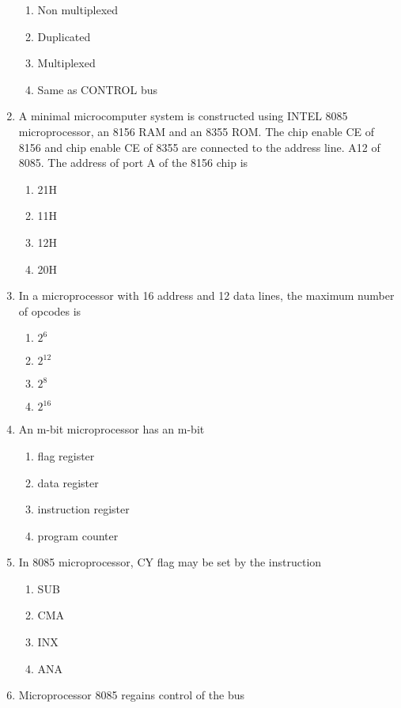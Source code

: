 \documentclass[journal,12pt,twocolumn]{IEEEtran}
\begin{document}
\begin{enumerate}
       \begin{enumerate}
      \item Non multiplexed
      \item Duplicated
      \item  Multiplexed 
      \item Same as CONTROL bus
    \end{enumerate}
    \item A minimal microcomputer system is constructed using INTEL 8085 microprocessor, an
8156 RAM and an 8355 ROM. The chip enable CE of 8156 and chip enable CE of 8355 are
connected to the address line. A12 of 8085. The address of port A of the 8156 chip is
     \begin{enumerate}
      \item 21H 
      \item 11H
      \item 12H
      \item 20H
    \end{enumerate}
    \item In a microprocessor with 16 address and 12 data lines, the maximum number of opcodes is
    \begin{enumerate}
      \item $2^{6}$  
      \item $2^{12}$  
      \item $2^{8}$ 
      \item $2^{16}$
    \end{enumerate}
    \item An m-bit microprocessor has an m-bit
     \begin{enumerate}
      \item flag register 
      \item data register
      \item instruction register
      \item  program counter
    \end{enumerate}
    \item In 8085 microprocessor, CY flag may be set by the instruction\\
     \begin{enumerate}
      \item SUB 
      \item CMA
      \item INX
      \item ANA
    \end{enumerate}
    \item Microprocessor 8085 regains control of the bus\\

\end{enumerate}
\end{document}
